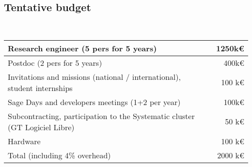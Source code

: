 \documentclass[a4,12pt]{amsart}
\newcommand{\TODO}[2][To do: ]{{\textcolor{red}{\textbf{#1#2}}}}
\begin{document}
\subsection{Tentative budget}
\ \\
\begin{tabular}{|l|r|}\hline
  Research engineer (5 pers for 5 years)                       & 1250k\euro          \\\hline
  Postdoc           (2 pers for 5 years)                       &  400k\euro\\\hline
  Invitations and missions (national / international), student internships & 100 k\euro          \\\hline
  Sage Days and developers meetings (1+2 per year)             & 100k\euro    \\\hline
  Subcontracting, participation to the Systematic cluster (GT Logiciel Libre)  & 50 k\euro\\\hline
  Hardware                                                     & 100 k\euro\\\hline
  Total (including 4\% overhead)                               & 2000 k\euro\\\hline
\end{tabular}


\end{document}
